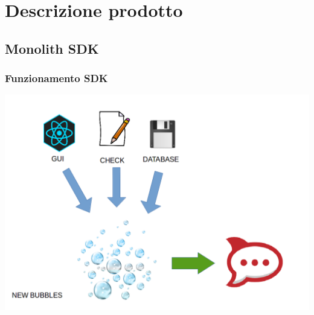 \section{Descrizione prodotto}


\subsection{Monolith SDK}


\begin{frame}
  \frametitle{Funzionamento SDK}
  \begin{center}
    \includegraphics[width=\linewidth,height=.8\textheight,keepaspectratio]{img/uso_sdk.png}
  \end{center}
\end{frame}

